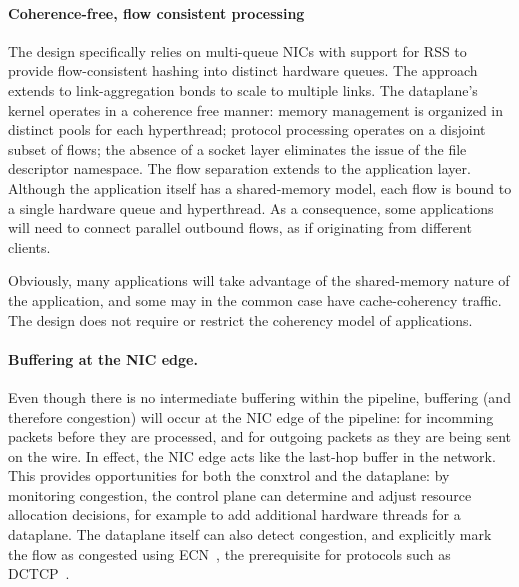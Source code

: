 \paragraph{Coherence-free, flow consistent processing}

The design specifically relies on multi-queue NICs with support for
RSS to provide flow-consistent hashing into distinct hardware queues.
The approach extends to link-aggregation bonds to scale to multiple
links.  The dataplane's kernel operates in a coherence free manner:
memory management is organized in distinct pools for each hyperthread;
protocol processing operates on a disjoint subset of flows; the
absence of a socket layer eliminates the issue of the file descriptor
namespace.  The flow separation extends to the application layer.
Although the application itself has a shared-memory model, each flow
is bound to a single hardware queue and hyperthread.  As a
consequence, some applications will need to connect parallel outbound
flows, as if originating from different clients.

Obviously, many applications will take advantage of the shared-memory
nature of the application, and some may in the common case have
cache-coherency traffic.  The design does not require or restrict the coherency model of applications.

\paragraph{Buffering at the NIC edge.}

Even though there is no intermediate buffering within the pipeline,
buffering (and therefore congestion) will occur at the NIC edge of the
pipeline: for incomming packets before they are processed, and for
outgoing packets as they are being sent on the wire.  In effect, the
NIC edge acts like the last-hop buffer in the network.  This provides
opportunities for both the conxtrol and the dataplane: by monitoring
congestion, the control plane can determine and adjust resource
allocation decisions, for example to add additional hardware threads
for a dataplane.  The dataplane itself can also detect congestion, and
explicitly mark the flow as congested using ECN~\cite{}, the
prerequisite for protocols such as
DCTCP~\cite{DBLP:conf/sigcomm/AlizadehGMPPPSS10}. 

